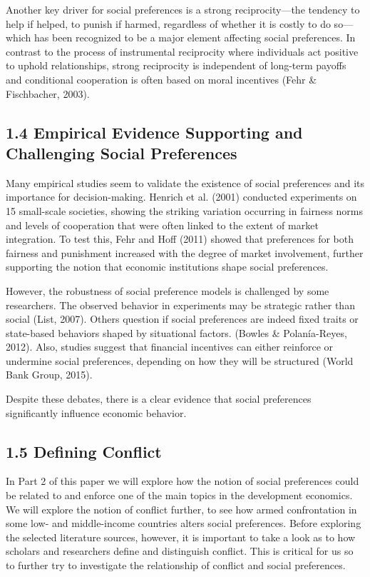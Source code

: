 \documentclass[14pt]{article}
\theoremstyle{remark}
\begin{document}
Another key driver for social preferences is a strong reciprocity---the tendency to help if helped, to punish if harmed, regardless of whether it is costly to do so---which has been recognized to be a major element affecting social preferences. In contrast to the process of instrumental reciprocity where individuals act positive to uphold relationships, strong reciprocity is independent of long-term payoffs and conditional cooperation is often based on moral incentives (Fehr \& Fischbacher, 2003).

\subsection{1.4 Empirical Evidence Supporting and Challenging Social Preferences}

Many empirical studies seem to validate the existence of social preferences and its importance for decision-making. Henrich et al. (2001) conducted experiments on 15 small-scale societies, showing the striking variation occurring in fairness norms and levels of cooperation that were often linked to the extent of market integration. To test this, Fehr and Hoff (2011) showed that preferences for both fairness and punishment increased with the degree of market involvement, further supporting the notion that economic institutions shape social preferences.

However, the robustness of social preference models is challenged by some researchers. The observed behavior in experiments may be strategic rather than social (List, 2007). Others question if social preferences are indeed fixed traits or state-based behaviors shaped by situational factors. (Bowles \& Polanía-Reyes, 2012). Also, studies suggest that financial incentives can either reinforce or undermine social preferences, depending on how they will be structured (World Bank Group, 2015).

Despite these debates, there is a clear evidence that social preferences significantly influence economic behavior.

\subsection{1.5 Defining Conflict}

In Part 2 of this paper we will explore how the notion of social preferences could be related to and enforce one of the main topics in the development economics. We will explore the notion of conflict further, to see how armed confrontation in some low- and middle-income countries alters social preferences. Before exploring the selected literature sources, however, it is important to take a look as to how scholars and researchers define and distinguish conflict. This is critical for us so to further try to investigate the relationship of conflict and social preferences.
\end{document}
